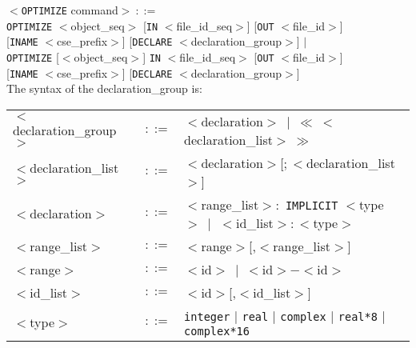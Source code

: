 $<${\tt OPTIMIZE} command$>~::=$\\
 \hspace*{1cm} {\tt OPTIMIZE} $<$object\_seq$>$ [{\tt IN} $<$file\_id\_seq$>$]
 [{\tt OUT} $<$file\_id$>$]\\
 \hspace*{3cm} [{\tt INAME} $<$cse\_prefix$>$]
  [{\tt DECLARE} $<$declaration\_group$>$] $\mid$\\
 \hspace*{1cm} {\tt OPTIMIZE} [$<$object\_seq$>$] {\tt IN} $<$file\_id\_seq$>$
 [{\tt OUT} $<$file\_id$>$]\\
 \hspace*{3cm} [{\tt INAME} $<$cse\_prefix$>$]
 [{\tt DECLARE} $<$declaration\_group$>$]\\

The syntax of the declaration\_group is:
\begin{center}
\begin{tabular}{lcl}
$<$declaration\_group$>$ & $::=$ & $<$declaration$>~\mid~\ll~<$declaration\_list$>~\gg$\\
$<$declaration\_list$>$ & $::=$ & $<$declaration$>$[$;<$declaration\_list$>$]\\
$<$declaration$>$ & $::=$ & $<$range\_list$>:$ {\tt IMPLICIT} $<$type$>~\mid$
 $<$id\_list$>:<$type$>$\\
$<$range\_list$>$& $::=$ & $<$range$>$[,$<$range\_list$>$]\\
$<$range$>$ & $::=$ & $<$id$>~\mid~<$id$>-<$id$>$\\
$<$id\_list$>$ & $::=$ & $<$id$>$[,$<$id\_list$>$]\\
$<$type$>$ & $::=$ & {\tt integer} $\mid$ {\tt real} $\mid$ {\tt complex} $\mid$ {\tt real*8} $\mid$ {\tt complex*16}
\end{tabular}
\end{center}

